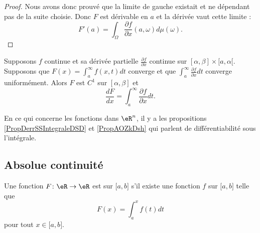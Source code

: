 \begin{proof}
        Nous avons donc prouvé que la limite de gauche existait et ne dépendant pas de la suite choisie. Donc \( F\) est dérivable en \( a\) et la dérivée vaut cette limite :
        \begin{equation}
            F'(a)=\int_{\Omega}\frac{ \partial f }{ \partial x }(a,\omega)d\mu(\omega).
        \end{equation}
\end{proof}

\begin{theorem}
		Supposons $f$ continue et sa dérivée partielle $\frac{ \partial f }{ \partial x }$ continue sur $[\alpha,\beta]\times[a,\alpha[$. Supposons que $F(x)=\int_a^{\infty}f(x,t)dt$ converge et que $\int_a^{\infty}\frac{ \partial f }{ \partial x }dt$ converge uniformément. Alors $F$ est $C^1$ sur $[\alpha,\beta]$ et 
		\begin{equation}
			\frac{ dF }{ dx }=\int_a^{\infty}\frac{ \partial f }{ \partial x }dt.
		\end{equation}
\end{theorem}

En ce qui concerne les fonctions dans \( \eR^n\), il y a les  propositions \ref{PropDerrSSIntegraleDSD} et \ref{PropAOZkDsh} qui parlent de différentiabilité sous l'intégrale.

\subsection{Absolue continuité}

\begin{definition}      \label{DefAbsoluCont}
    Une fonction \( F\colon \eR\to \eR\) est  sur \( \mathopen[ a , b \mathclose]\) s'il existe une fonction \( f\) sur \( \mathopen[ a , b \mathclose]\) telle que
    \begin{equation}
        F(x)=\int_a^xf(t)dt
    \end{equation}
    pour tout \( x\in\mathopen[ a , b \mathclose]\).
\end{definition}

